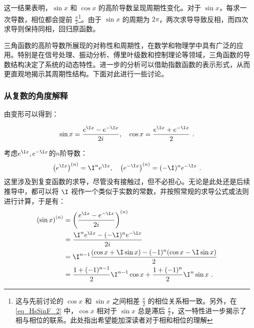 这一结果表明，$\sin x$ 和 $\cos x$ 的高阶导数呈现周期性变化。对于 $\sin x$，每求一次导数，相位都会提前 $\displaystyle\frac{\pi}{2}$\footnote{这与先前讨论的 $\cos x$ 和 $\sin x$ 之间相差 $\displaystyle\frac{\pi}{2}$ 的相位关系相一致。另外，在 \autoref{eq_HsSinF_2} 中，$\cos x$ 相对于 $\sin x$ 总是滞后 $\frac{\pi}{2}$，这一特性进一步揭示了相与相位的联系。此处指出希望能加深读者对于相和相位的理解}。由于 $\sin x$ 的周期为 $2\pi$，两次求导导致反相，而四次求导则保持同相，回归原函数。

三角函数的高阶导数所展现的对称性和周期性，在数学和物理学中具有广泛的应用。特别是在信号处理、振动分析、傅里叶级数和控制理论等领域，三角函数的导数结构决定了系统的动态特性。进一步的分析可以借助指数函数的表示形式，从而更直观地揭示其周期性结构。下面对此进行一些讨论。

\subsubsection{从复数的角度解释}

由变形可以得到：

\begin{equation}
\sin x = \frac{e^{\I x} - e^{-\I x}}{2i}, \quad \cos x = \frac{e^{\I x} + e^{-\I x}}{2}~.
\end{equation}

考虑$e^{\I x},e^{-\I x}$的$n$阶导数：
\begin{equation}
\left(e^{\I x}\right)^{(n)} = \I^n e^{\I x},\quad\left(e^{-\I x}\right)^{(n)} = (-\I)^n e^{-\I x}~.
\end{equation}
这里涉及到复变函数的求导，尽管没有接触过，但不必担心。无论是此处还是后续推导中，都可以将 $\I$ 视作一个类似于实数的常数，并按照常规的求导公式或法则进行计算，于是有：
\begin{equation}
\begin{split}
\left( \sin x \right)^{(n)} &= \left( \frac{e^{\I x} - e^{-\I x}}{2i} \right)^{(n)}\\
&=\frac{\I^n e^{\I x} - (-\I)^n e^{-\I x}}{2i}\\
&=\I^{n-1} \frac{(\cos x+\I\sin x) - (-1)^{n}(\cos x-\I\sin x )}{2}\\
&=\frac{1+(-1)^{n-1}}{2}\I^{n-1} \cos x+\frac{1+(-1)^{n}}{2}\I^{n} \sin x~.
\end{split}
\end{equation}

